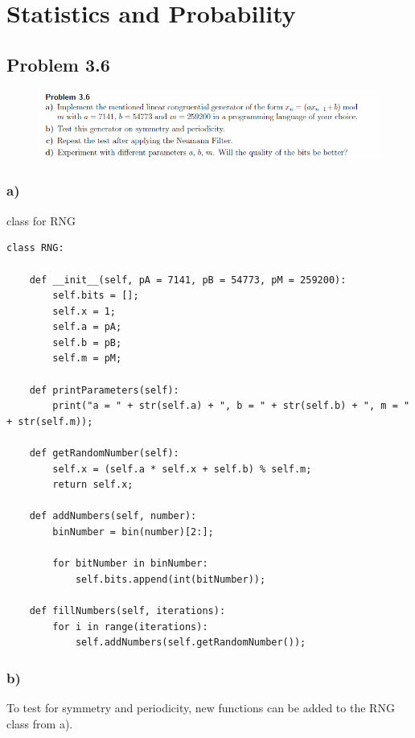 \section{Statistics and Probability}


\subsection{Problem 3.6}


\begin{figure}[!ht]
\includegraphics[width=1\textwidth]{chapters/images/desc-3-6}
\end{figure}


\subsubsection{a)}

class for RNG

\begin{lstlisting}[caption=Problem 3.6 a)]
class RNG:
	
	def __init__(self, pA = 7141, pB = 54773, pM = 259200):
		self.bits = [];
		self.x = 1;
		self.a = pA;
		self.b = pB;
		self.m = pM;
	
	def printParameters(self):
		print("a = " + str(self.a) + ", b = " + str(self.b) + ", m = " + str(self.m));
	
	def getRandomNumber(self):
		self.x = (self.a * self.x + self.b) % self.m;
		return self.x;
	
	def addNumbers(self, number):
		binNumber = bin(number)[2:];
		
		for bitNumber in binNumber:
			self.bits.append(int(bitNumber));
	
	def fillNumbers(self, iterations):
		for i in range(iterations):
			self.addNumbers(self.getRandomNumber());
\end{lstlisting}


\subsubsection{b)}

To test for symmetry and periodicity, new functions can be added to the RNG class from a).

